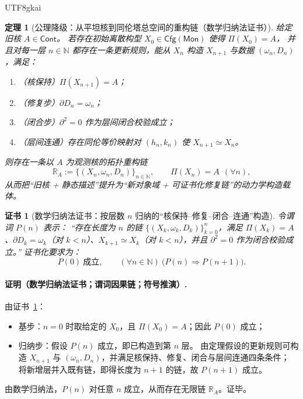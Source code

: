 \documentclass[12pt]{article}
\newtheorem{theorem}{定理}[section]
\newtheorem{Certificate}{证书}[section]
\newcommand{\NN}{\mathbb{N}}
\begin{document}
\begin{CJK*}{UTF8}{gkai}
\begin{theorem}[公理降级：从平坦核到同伦塔总空间的重构链（数学归纳法证书）]
\label{thm:tex29-ch14-reconstruction}
给定旧核 $A\in\mathsf{Cont}$。
若存在初始离散构型 $X_0\in\mathsf{Cfg}(\mathsf{Mon})$ 使得 $\Pi(X_0)=A$，
并且对每一层 $n\in\NN$ 都存在一条更新规则，能从 $X_n$ 构造 $X_{n+1}$ 与数据 $(\omega_n,D_n)$，满足：
\begin{enumerate}
  \item （核保持）$\Pi(X_{n+1})=A$；
  \item （修复步）$\partial D_n=\omega_n$；
  \item （闭合步）$\partial^2=0$ 作为层间闭合校验成立；
  \item （层间连通）存在同伦等价映射对 $(h_n,k_n)$ 使 $X_{n+1}\simeq X_n$。
\end{enumerate}
则存在一条以 $A$ 为观测核的拓扑重构链
\[
  \mathbb{R}_A:=\bigl\{(X_n,\omega_n,D_n)\bigr\}_{n\in\NN},
  \qquad \Pi(X_n)=A\ \ (\forall n),
\]
从而把“旧核 + 静态描述”提升为“新对象域 + 可证书化修复链”的动力学构造载体。
\end{theorem}

\begin{Certificate}[数学归纳法证书：按层数 $n$ 归纳的“核保持--修复--闭合--连通”构造]
\label{cert:tex29-ch14-reconstruction}
令谓词 $P(n)$ 表示：
“存在长度为 $n$ 的链 $\{(X_k,\omega_k,D_k)\}_{k=0}^{n}$，满足
$\Pi(X_k)=A$、$\partial D_k=\omega_k$（对 $k<n$）、$X_{k+1}\simeq X_k$（对 $k<n$），并且 $\partial^2=0$ 作为闭合校验成立。”
证书化要求为：
\[
  P(0)\ \text{成立},\qquad (\forall n\in\NN)\ \bigl(P(n)\Rightarrow P(n+1)\bigr).
\]
\end{Certificate}

\paragraph{证明（数学归纳法证书；谓词因果链；符号推演）.}
由证书~\ref{cert:tex29-ch14-reconstruction}：
\begin{itemize}
  \item 基步：$n=0$ 时取给定的 $X_0$，且 $\Pi(X_0)=A$；因此 $P(0)$ 成立；
  \item 归纳步：假设 $P(n)$ 成立，即已构造到第 $n$ 层。
  由定理假设的更新规则可构造 $X_{n+1}$ 与 $(\omega_n,D_n)$，并满足核保持、修复、闭合与层间连通四条条件；
  将新增层并入既有链，即得长度为 $n+1$ 的链，故 $P(n+1)$ 成立。
\end{itemize}
由数学归纳法，$P(n)$ 对任意 $n$ 成立，从而存在无限链 $\mathbb{R}_A$。证毕。


\end{CJK*}
\end{document}
